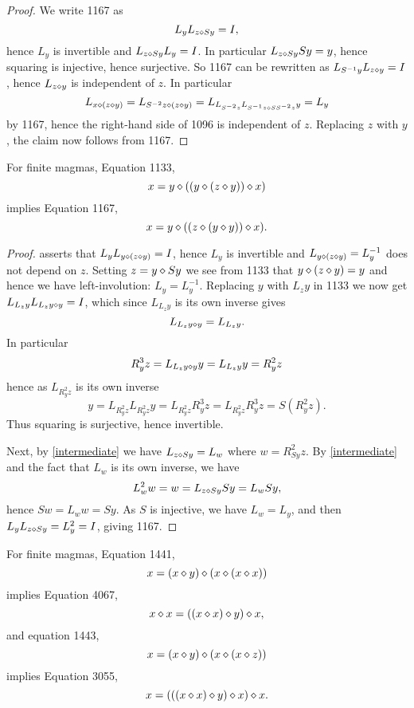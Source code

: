 \begin{proof}\leanok We write 1167 as
  $$ L_y L_{z \diamond Sy} = I,$$
hence $L_y$ is invertible and $L_{z \diamond Sy} L_y = I$.  In particular $L_{z \diamond Sy} Sy = y$, hence squaring is injective, hence surjective.  So 1167 can be rewritten as $L_{S^{-1} y} L_{z \diamond y} = I$, hence $L_{z \diamond y}$ is independent of $z$.  In particular
$$ L_{x \diamond (z \diamond y)} = L_{S^{-2} z \diamond (z \diamond y)} = L_{L_{S^{-2} z} L_{S^{-1} z \diamond S S^{-2} z} y} = L_y$$
by 1167, hence the right-hand side of 1096 is independent of $z$.  Replacing $z$ with $y$, the claim now follows from 1167.
\end{proof}

\begin{proposition}[1133 implies 1167]\label{1133-1167}\leanok{}
  For finite magmas, Equation 1133,
$$ x = y \diamond ((y \diamond (z \diamond y)) \diamond x)$$
implies Equation 1167,
  $$ x = y \diamond ((z \diamond (y \diamond y)) \diamond x).$$
\end{proposition}

\begin{proof} asserts that $L_y L_{y \diamond (z \diamond y)} = I$, hence $L_y$ is invertible and $L_{y \diamond (z \diamond y)} = L_y^{-1}$ does not depend on $z$.  Setting $z = y \diamond Sy$ we see from 1133 that $y \diamond (z \diamond y) = y$ and hence we have left-involution: $L_y = L_y^{-1}$. Replacing $y$ with $L_z y$ in 1133 we now get $L_{L_z y} L_{L_z y \diamond y} = I$, which since $L_{L_z y}$ is its own inverse gives
\begin{equation}\label{intermediate}
  L_{L_z y \diamond y} = L_{L_z y}.
\end{equation}
In particular
$$ R_y^3 z = L_{L_z y \diamond y} y = L_{L_z y} y = R_y^2 z$$
hence as $L_{R_y^2 z}$ is its own inverse
$$ y =L_{R_y^2 z} L_{R_y^2 z} y = L_{R_y^2 z} R_y^3 z =
L_{R_y^2 z} R_y^3 z = S( R_y^2 z).$$
Thus squaring is surjective, hence invertible.

Next, by \eqref{intermediate} we have $L_{z \diamond Sy} = L_w$ where $w = R_{Sy}^2 z$.  By \eqref{intermediate} and the fact that $L_w$ is its own inverse, we have
$$ L_w^2 w = w = L_{z \diamond Sy} Sy =L_w Sy,$$
hence $Sw = L_w w = Sy$.  As $S$ is injective, we have $L_w = L_y$, and then $L_y L_{z \diamond Sy} = L_y^2 = I$, giving 1167.
\end{proof}

\begin{proposition}\label{1441-4067-1443-3055}\leanok{}
  For finite magmas, Equation 1441,
$$ x = (x \diamond y) \diamond (x \diamond (x \diamond x))$$
implies Equation 4067,
$$ x \diamond x = ((x \diamond x) \diamond y) \diamond x,$$
and equation 1443,
$$ x = (x \diamond y) \diamond (x \diamond (x \diamond z))$$
implies Equation 3055,
$$ x = (((x \diamond x) \diamond y) \diamond x) \diamond x.$$
\end{proposition}

